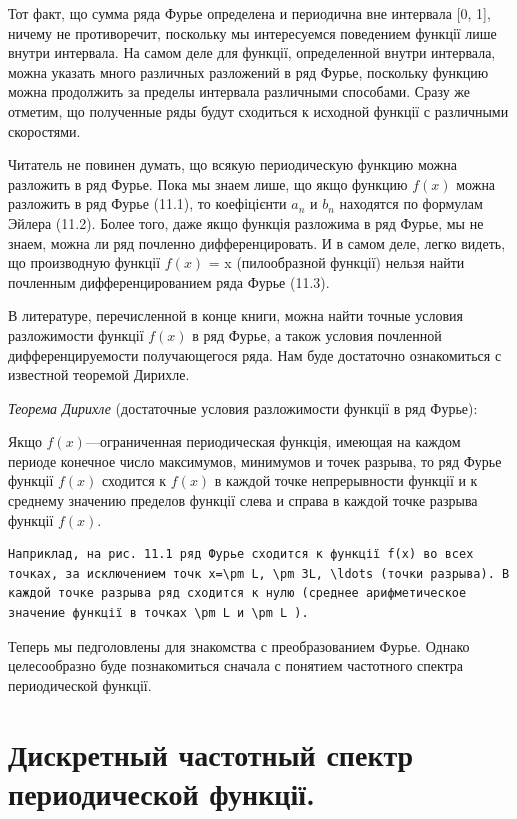\documentclass[
]{article}
\begin{document}
{{Тот факт, що сумма ряда Фурье определена и периодична вне интервала
{[}0, 1{]}, ничему не противоречит, поскольку мы интересуемся поведением
функції лише внутри интервала. На самом деле для функції, определенной
внутри интервала, можна указать много различных разложений в ряд Фурье,
поскольку функцию можна продолжить за пределы интервала различными
способами. Сразу же отметим, що полученные ряды будут сходиться к
исходной функції с различными скоростями.

Читатель не повинен думать, що всякую периодическую функцию можна
разложить в ряд Фурье. Пока мы знаем лише, що якщо функцию \(f(x)\)
можна разложить в ряд Фурье (11.1), то коефіцієнти \(a_n\) и \(b_n\)
находятся по формулам Эйлера (11.2). Более того, даже якщо функція
разложима в ряд Фурье, мы не знаем, можна ли ряд почленно
дифференцировать. И в самом деле, легко видеть, що производную функції
\(f(x)\) = x (пилообразной функції) нельзя найти почленным
дифференцированием ряда Фурье (11.3).

В литературе, перечисленной в конце книги, можна найти точные условия
разложимости функції \(f(x)\) в ряд Фурье, а також условия почленной
дифференцируемости получающегося ряда. Нам буде достаточно ознакомиться
с известной теоремой Дирихле.

\emph{Теорема Дирихле} (достаточные условия разложимости функції в ряд
Фурье):

Якщо \(f(x)\)---ограниченная периодическая функція, имеющая на каждом
периоде конечное число максимумов, минимумов и точек разрыва, то ряд
Фурье функції \(f(x)\) сходится к \(f(x)\) в каждой точке непрерывности
функції и к среднему значению пределов функції слева и справа в каждой
точке разрыва функції \(f(x)\).

\begin{verbatim}
Наприклад, на рис. 11.1 ряд Фурье сходится к функції f(x) во всех точках, за исключением точк x=\pm L, \pm 3L, \ldots (точки разрыва). В каждой точке разрыва ряд сходится к нулю (среднее арифметическое значение функції в точках \pm L и \pm L ).
\end{verbatim}

Теперь мы педголовлены для знакомства с преобразованием Фурье. Однако
целесообразно буде познакомиться сначала с понятием частотного спектра
периодической функції.

\section{Дискретный частотный спектр периодической
функції.}\label{ux434ux438ux441ux43aux440ux435ux442ux43dux44bux439-ux447ux430ux441ux442ux43eux442ux43dux44bux439-ux441ux43fux435ux43aux442ux440-ux43fux435ux440ux438ux43eux434ux438ux447ux435ux441ux43aux43eux439-ux444ux443ux43dux43aux446ux456ux457.}

}}
\end{document}
